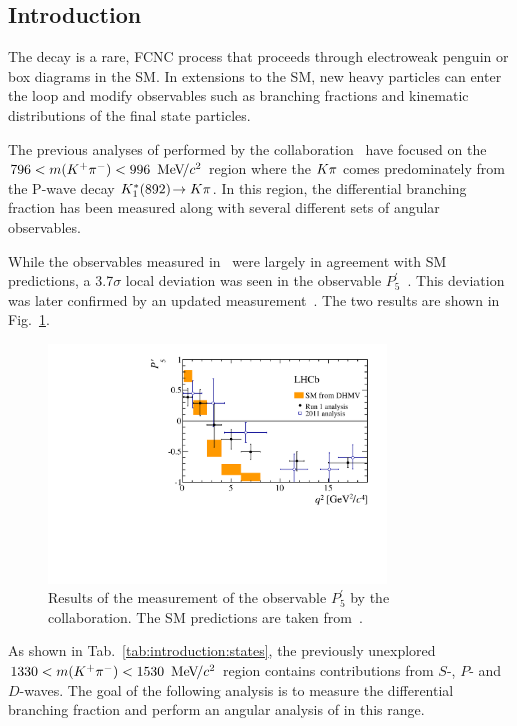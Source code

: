 \subsection{Introduction}
\label{sec:kpimm:introduction}

The decay \BdToKpimm is a rare, FCNC process that proceeds through electroweak penguin or box diagrams in the SM. In extensions to the SM, new heavy particles can enter the loop and modify observables such as branching fractions and kinematic distributions of the final state particles. 

The previous analyses of \BdToKpimm performed by the \lhcb collaboration~\cite{kstmm-0.3fb,kstmm-1fb,kstmm-1fb-pprime,kstmm-3fb} have focused on the $796<m({{K}^+}{{\pi}^-})<996~{\mathrm{\,Me\kern -0.1em V\!/}c^2}$ region where the ${K}{\pi}$ comes predominately from the P-wave decay ${{K}^{*}_{1}}(892)\!\rightarrow K\pi$. In this region, the differential branching fraction has been measured along with several different sets of angular observables.

While the observables measured in~\cite{kstmm-0.3fb,kstmm-1fb} were largely in agreement with SM predictions, a 3.7$\sigma$ local deviation was seen in the observable $P_{5}^{'}$~\cite{kstmm-1fb-pprime}. This deviation was later confirmed by an updated measurement~\cite{kstmm-3fb}. The two results are shown in Fig.~\ref{fig:kpimm:p5prime}. 

\begin{figure}[!tb]
\centering
\includegraphics[width=0.8\textwidth]{figs/kpimm/introduction/P5prime.pdf}
\caption{Results of the measurement of the observable $P_{5}^{'}$ by the \lhcb collaboration. The SM predictions are taken from~\cite{pprime-theory}.}
\label{fig:kpimm:p5prime}
\end{figure}

As shown in Tab.~\ref{tab:introduction:states}, the previously unexplored $1330<m({{K}^+}{{\pi}^-})<1530~{\mathrm{\,Me\kern -0.1em V\!/}c^2}$ region contains contributions from $S$-, $P$- and $D$-waves. The goal of the following analysis is to measure the differential branching fraction and perform an angular analysis of \BdToKpimm in this \mkpi range.
 
